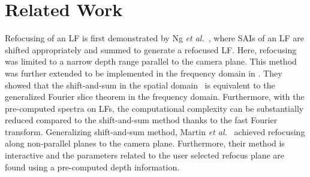 \section{Related Work}\label{sec:relatedWork}
 
Refocusing of an LF is first demonstrated by Ng \textit{et al.}~\cite{ng2005light}, where SAIs of an LF are shifted appropriately and summed to generate a refocused LF. Here, refocusing was limited to a narrow depth range parallel to the camera plane. This method was further extended to be implemented in the frequency domain in \cite{ng2005fourier}. They showed that the shift-and-sum in the spatial domain~\cite{ng2005light} is equivalent to the generalized Fourier slice theorem in the frequency domain. Furthermore, with the pre-computed spectra on LFs, the computational complexity can be substantially reduced compared to the shift-and-sum method thanks to the fast Fourier transform. Generalizing shift-and-sum method, Martin \textit{et al.}~\cite{tilt_shift} achieved refocusing along non-parallel planes to the camera plane. Furthermore, their method is interactive and the parameters related to the user selected refocus plane are found using a pre-computed depth information. 


